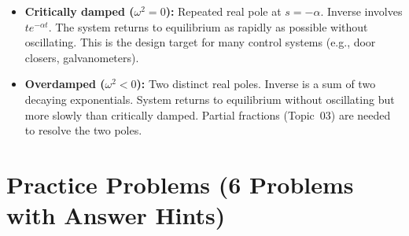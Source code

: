 \documentclass[12pt,a4paper]{article}
\begin{document}
\begin{enumerate}[leftmargin=*, label=\textbf{Q\arabic*.}]
\begin{itemize}[leftmargin=*]
  \item \textbf{Critically damped ($\omega^2 = 0$):} Repeated real pole at $s = -\alpha$.
        Inverse involves $te^{-\alpha t}$. The system returns to equilibrium as rapidly
        as possible without oscillating. This is the design target for many control systems
        (e.g., door closers, galvanometers).

  \item \textbf{Overdamped ($\omega^2 < 0$):} Two distinct real poles.
        Inverse is a sum of two decaying exponentials. System returns to equilibrium
        without oscillating but more slowly than critically damped. Partial fractions
        (Topic~03) are needed to resolve the two poles.
\end{itemize}

\end{enumerate}

\section{Practice Problems (6 Problems with Answer Hints)}
\end{document}
